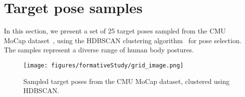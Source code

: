 \clearpage
\newpage

\section{Target pose samples}
\label{appendix:poses}

In this section, we present a set of 25 target poses sampled from the CMU MoCap dataset~\cite{CMUMocap}, using the HDBSCAN clustering algorithm~\cite{leland2017hdbscan} for pose selection. 
The samples represent a diverse range of human body postures.

\begin{figure}[h]
    \centering
    \texttt{[image: figures/formativeStudy/grid\_image.png]}
    \caption{Sampled target poses from the CMU MoCap dataset, clustered using HDBSCAN.}
    \label{figure:targetpose}
\end{figure}